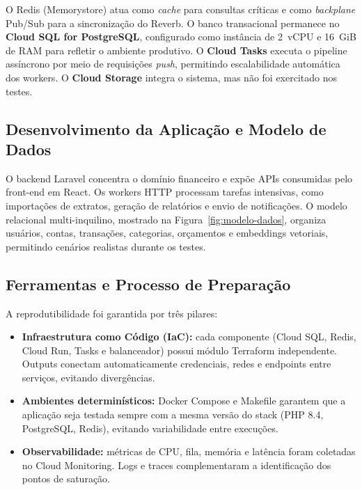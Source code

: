 O Redis (Memorystore) atua como \textit{cache} para consultas críticas e como \textit{backplane}
Pub/Sub para a sincronização do Reverb. O banco transacional permanece no \textbf{Cloud SQL for PostgreSQL},
configurado como instância de 2~vCPU e 16~GiB de RAM para refletir o ambiente produtivo.
O \textbf{Cloud Tasks} executa o pipeline assíncrono por meio de requisições \textit{push},
permitindo escalabilidade automática dos workers. O \textbf{Cloud Storage} integra o sistema,
mas não foi exercitado nos testes.

\subsection{Desenvolvimento da Aplicação e Modelo de Dados}

O backend Laravel concentra o domínio financeiro e expõe APIs consumidas pelo front-end em React.
Os workers HTTP processam tarefas intensivas, como importações de extratos, geração de relatórios e envio de notificações.
O modelo relacional multi-inquilino, mostrado na Figura~\ref{fig:modelo-dados},
organiza usuários, contas, transações, categorias, orçamentos e embeddings vetoriais,
permitindo cenários realistas durante os testes.

\subsection{Ferramentas e Processo de Preparação}

A reprodutibilidade foi garantida por três pilares:

\begin{itemize}
    \item \textbf{Infraestrutura como Código (IaC):} cada componente
        (Cloud SQL, Redis, Cloud Run, Tasks e balanceador) possui módulo Terraform independente.
        Outputs conectam automaticamente credenciais, redes e endpoints entre serviços,
        evitando divergências.

    \item \textbf{Ambientes determinísticos:} Docker Compose e Makefile garantem que a aplicação
        seja testada sempre com a mesma versão do stack (PHP 8.4, PostgreSQL, Redis),
        evitando variabilidade entre execuções.

    \item \textbf{Observabilidade:} métricas de CPU, fila, memória e latência foram coletadas
        no Cloud Monitoring. Logs e traces complementaram a identificação dos pontos de saturação.
\end{itemize}

